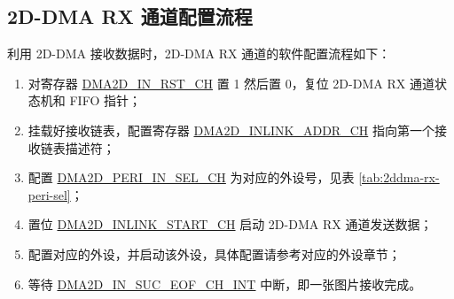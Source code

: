 \documentclass[main\_\_CN.tex]{subfiles}
\begin{document}
\subsection{2D-DMA RX 通道配置流程}
利用 2D-DMA 接收数据时，2D-DMA RX 通道的软件配置流程如下：
\begin{enumerate}
    \item 对寄存器 \hyperref[fielddesc:DMA2DINRSTCHN]{DMA2D\_IN\_RST\_CH} 置 1 然后置 0，复位 2D-DMA RX 通道状态机和 FIFO 指针；
    \item 挂载好接收链表，配置寄存器 \hyperref[fielddesc:DMA2DINLINKADDRCHN]{DMA2D\_INLINK\_ADDR\_CH} 指向第一个接收链表描述符；
    \item 配置 \hyperref[fielddesc:DMA2DINPERISELCHN]{DMA2D\_PERI\_IN\_SEL\_CH} 为对应的外设号，见表 \ref{tab:2ddma-rx-peri-sel}；
    \item 置位 \hyperref[fielddesc:DMA2DINLINKSTARTCHN]{DMA2D\_INLINK\_START\_CH} 启动 2D-DMA RX 通道发送数据；
    \item 配置对应的外设，并启动该外设，具体配置请参考对应的外设章节；
    \item 等待 \hyperref[int:DMA2DINSUCEOFINT]{DMA2D\_IN\_SUC\_EOF\_CH\_INT} 中断，即一张图片接收完成。
\end{enumerate}
\end{document}
